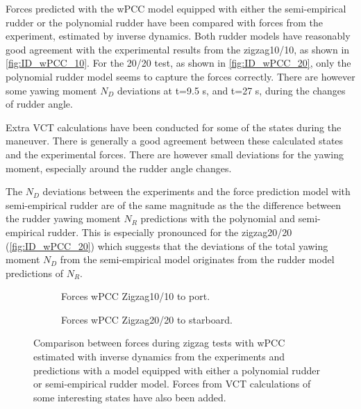 Forces predicted with the wPCC model equipped with either the semi-empirical rudder or the polynomial rudder have been compared with forces from the experiment, estimated by inverse dynamics. 
Both rudder models have reasonably good agreement with the experimental results from the zigzag10/10, as shown in \autoref{fig:ID_wPCC_10}. 
For the 20/20 test, as shown in \autoref{fig:ID_wPCC_20}, only the polynomial rudder model seems to capture the forces correctly. There are however some yawing moment $N_D$ deviations at t=9.5 s, and t=27 s, during the changes of rudder angle. 

Extra VCT calculations have been conducted for some of the states during the maneuver. There is generally a good agreement between these calculated states and the experimental forces. There are however small deviations for the yawing moment, especially around the rudder angle changes. 

The $N_D$ deviations between the experiments and the force prediction model with semi-empirical rudder are of the same magnitude as the the difference between the rudder yawing moment $N_R$ predictions with the polynomial and semi-empirical rudder. This is especially pronounced for the zigzag20/20 (\autoref{fig:ID_wPCC_20}) which suggests that the deviations of the total yawing moment $N_D$ from the semi-empirical model originates from the rudder model predictions of $N_R$. 
\begin{figure}[h]
     \centering
     \begin{subfigure}[b]{\textwidth}
         \centering
         
        \caption{Forces wPCC Zigzag10/10 to port.}
        \label{fig:ID_wPCC_10}
     \end{subfigure}
     \vfill
     \begin{subfigure}[b]{\textwidth}
         
        \caption{Forces wPCC Zigzag20/20 to starboard.}
        \label{fig:ID_wPCC_20}
     \end{subfigure}
        \caption{Comparison between forces during zigzag tests with wPCC estimated with inverse dynamics from the experiments and predictions with a model equipped with either a polynomial rudder or semi-empirical rudder model. Forces from VCT calculations of some interesting states have also been added.}
        \label{fig:ID_wPCC}
\end{figure}        